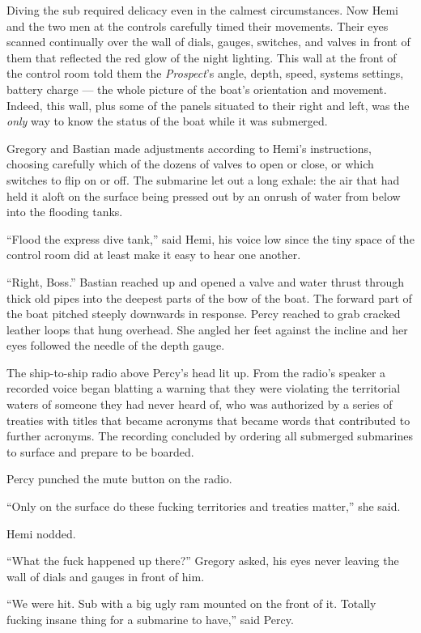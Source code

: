 \documentclass[
]{scrbook}
\begin{document}
Diving the sub required delicacy even in the calmest circumstances. Now
Hemi and the two men at the controls carefully timed their movements.
Their eyes scanned continually over the wall of dials, gauges, switches,
and valves in front of them that reflected the red glow of the night
lighting. This wall at the front of the control room told them the
\emph{Prospect}'s angle, depth, speed, systems settings, battery charge
--- the whole picture of the boat's orientation and movement. Indeed,
this wall, plus some of the panels situated to their right and left, was
the \emph{only} way to know the status of the boat while it was
submerged.

Gregory and Bastian made adjustments according to Hemi's instructions,
choosing carefully which of the dozens of valves to open or close, or
which switches to flip on or off. The submarine let out a long exhale:
the air that had held it aloft on the surface being pressed out by an
onrush of water from below into the flooding tanks.

``Flood the express dive tank,'' said Hemi, his voice low since the tiny
space of the control room did at least make it easy to hear one another.

``Right, Boss.'' Bastian reached up and opened a valve and water thrust
through thick old pipes into the deepest parts of the bow of the boat.
The forward part of the boat pitched steeply downwards in response.
Percy reached to grab cracked leather loops that hung overhead. She
angled her feet against the incline and her eyes followed the needle of
the depth gauge.

The ship-to-ship radio above Percy's head lit up. From the radio's
speaker a recorded voice began blatting a warning that they were
violating the territorial waters of someone they had never heard of, who
was authorized by a series of treaties with titles that became acronyms
that became words that contributed to further acronyms. The recording
concluded by ordering all submerged submarines to surface and prepare to
be boarded.

Percy punched the mute button on the radio.

``Only on the surface do these fucking territories and treaties
matter,'' she said.

Hemi nodded.

``What the fuck happened up there?'' Gregory asked, his eyes never
leaving the wall of dials and gauges in front of him.

``We were hit. Sub with a big ugly ram mounted on the front of it.
Totally fucking insane thing for a submarine to have,'' said Percy.
\end{document}
